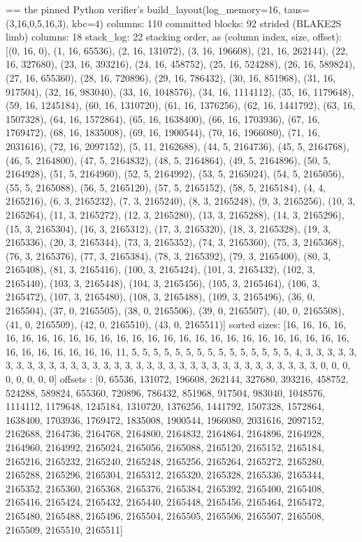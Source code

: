 \begin{srccode}
== the pinned Python verifier's build_layout(log_memory=16, taus=(3,16,0,5,16,3), kbc=4)
columns: 110 committed blocks: 92 strided (BLAKE2S limb) columns: 18
stack_log: 22
stacking order, as (column index, size, offset):
[(0, 16, 0), (1, 16, 65536), (2, 16, 131072), (3, 16, 196608), (21, 16, 262144), (22, 16, 327680), (23, 16, 393216), (24, 16, 458752), (25, 16, 524288), (26, 16, 589824), (27, 16, 655360), (28, 16, 720896), (29, 16, 786432), (30, 16, 851968), (31, 16, 917504), (32, 16, 983040), (33, 16, 1048576), (34, 16, 1114112), (35, 16, 1179648), (59, 16, 1245184), (60, 16, 1310720), (61, 16, 1376256), (62, 16, 1441792), (63, 16, 1507328), (64, 16, 1572864), (65, 16, 1638400), (66, 16, 1703936), (67, 16, 1769472), (68, 16, 1835008), (69, 16, 1900544), (70, 16, 1966080), (71, 16, 2031616), (72, 16, 2097152), (5, 11, 2162688), (44, 5, 2164736), (45, 5, 2164768), (46, 5, 2164800), (47, 5, 2164832), (48, 5, 2164864), (49, 5, 2164896), (50, 5, 2164928), (51, 5, 2164960), (52, 5, 2164992), (53, 5, 2165024), (54, 5, 2165056), (55, 5, 2165088), (56, 5, 2165120), (57, 5, 2165152), (58, 5, 2165184), (4, 4, 2165216), (6, 3, 2165232), (7, 3, 2165240), (8, 3, 2165248), (9, 3, 2165256), (10, 3, 2165264), (11, 3, 2165272), (12, 3, 2165280), (13, 3, 2165288), (14, 3, 2165296), (15, 3, 2165304), (16, 3, 2165312), (17, 3, 2165320), (18, 3, 2165328), (19, 3, 2165336), (20, 3, 2165344), (73, 3, 2165352), (74, 3, 2165360), (75, 3, 2165368), (76, 3, 2165376), (77, 3, 2165384), (78, 3, 2165392), (79, 3, 2165400), (80, 3, 2165408), (81, 3, 2165416), (100, 3, 2165424), (101, 3, 2165432), (102, 3, 2165440), (103, 3, 2165448), (104, 3, 2165456), (105, 3, 2165464), (106, 3, 2165472), (107, 3, 2165480), (108, 3, 2165488), (109, 3, 2165496), (36, 0, 2165504), (37, 0, 2165505), (38, 0, 2165506), (39, 0, 2165507), (40, 0, 2165508), (41, 0, 2165509), (42, 0, 2165510), (43, 0, 2165511)]
sorted sizes: [16, 16, 16, 16, 16, 16, 16, 16, 16, 16, 16, 16, 16, 16, 16, 16, 16, 16, 16, 16, 16, 16, 16, 16, 16, 16, 16, 16, 16, 16, 16, 16, 16, 11, 5, 5, 5, 5, 5, 5, 5, 5, 5, 5, 5, 5, 5, 5, 5, 4, 3, 3, 3, 3, 3, 3, 3, 3, 3, 3, 3, 3, 3, 3, 3, 3, 3, 3, 3, 3, 3, 3, 3, 3, 3, 3, 3, 3, 3, 3, 3, 3, 3, 3, 0, 0, 0, 0, 0, 0, 0, 0]
offsets     : [0, 65536, 131072, 196608, 262144, 327680, 393216, 458752, 524288, 589824, 655360, 720896, 786432, 851968, 917504, 983040, 1048576, 1114112, 1179648, 1245184, 1310720, 1376256, 1441792, 1507328, 1572864, 1638400, 1703936, 1769472, 1835008, 1900544, 1966080, 2031616, 2097152, 2162688, 2164736, 2164768, 2164800, 2164832, 2164864, 2164896, 2164928, 2164960, 2164992, 2165024, 2165056, 2165088, 2165120, 2165152, 2165184, 2165216, 2165232, 2165240, 2165248, 2165256, 2165264, 2165272, 2165280, 2165288, 2165296, 2165304, 2165312, 2165320, 2165328, 2165336, 2165344, 2165352, 2165360, 2165368, 2165376, 2165384, 2165392, 2165400, 2165408, 2165416, 2165424, 2165432, 2165440, 2165448, 2165456, 2165464, 2165472, 2165480, 2165488, 2165496, 2165504, 2165505, 2165506, 2165507, 2165508, 2165509, 2165510, 2165511]

\end{srccode}
